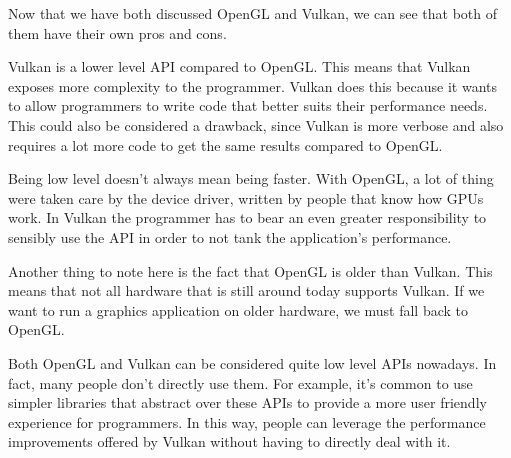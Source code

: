 Now that we have both discussed OpenGL and Vulkan, we can see that both of
them have their own pros and cons.

Vulkan is a lower level API compared to OpenGL.
This means that Vulkan exposes more complexity to the programmer.
Vulkan does this because it wants to allow programmers to write code that
better suits their performance needs.
This could also be considered a drawback, since Vulkan is more verbose and
also requires a lot more code to get the same results compared to OpenGL.

Being low level doesn't always mean being faster.
With OpenGL, a lot of thing were taken care by the device driver, written
by people that know how GPUs work.
In Vulkan the programmer has to bear an even greater responsibility
to sensibly use the API in order to not tank the application's performance.

Another thing to note here is the fact that OpenGL is older than Vulkan.
This means that not all hardware that is still around today supports Vulkan.
If we want to run a graphics application on older hardware, we must fall back
to OpenGL.

Both OpenGL and Vulkan can be considered quite low level APIs nowadays.
In fact, many people don't directly use them.
For example, it's common to use simpler libraries that abstract over these
APIs to provide a more user friendly experience for programmers.
In this way, people can leverage the performance improvements offered by Vulkan
without having to directly deal with it.
